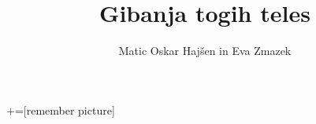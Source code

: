\documentclass{beamer} %
\author{Matic Oskar Hajšen in Eva Zmazek}
\title{Gibanja togih teles}
\begin{document}
\begin{comment}
:Title: Beamer arrows
:Tags: Remember picture, Beamer, Physics & chemistry, Overlays
:Use page: 3

With PGF/TikZ version 1.09 and later, it is possible to draw paths between nodes across
different pictures. This is a useful feature for presentations with the
Beamer package. In this example I've combined the new PGF/TikZ's overlay feature
with Beamer overlays. Download the PDF version to see the result.

**Note.** This only works with PDFTeX, and you have to run PDFTeX twice.

| Author: Kjell Magne Fauske

\end{comment}

\begin{frame}
\titlepage
\end{frame}

\begin{frame}

\end{frame}


+=[remember picture]

\everymath{\displaystyle}
\end{document}
